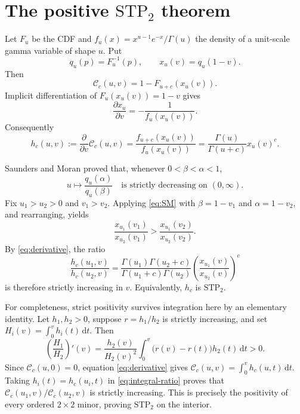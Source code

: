 \documentclass[11pt]{article}
\newcommand{\Cc}{\mathcal C}
\newcommand{\dd}{\,\mathrm d}
\newcommand{\STP}{\mathrm{STP}}
\begin{document}
\section*{The positive \texorpdfstring{\(\STP_2\)}{STP2} theorem}

Let \(F_u\) be the CDF and \(f_u(x)=x^{u-1}e^{-x}/\Gamma(u)\) the density of a
unit-scale gamma variable of shape \(u\).  Put
\[
 q_u(p)=F_u^{-1}(p),\qquad x_u(v)=q_u(1-v).
\]
Then
\[
 \Cc_c(u,v)=1-F_{u+c}(x_u(v)).
\]
Implicit differentiation of \(F_u(x_u(v))=1-v\) gives
\[
 \frac{\partial x_u}{\partial v}=-\frac1{f_u(x_u(v))}.
\]
Consequently
\begin{equation}\label{eq:derivative}
 h_c(u,v):=\frac{\partial}{\partial v}\Cc_c(u,v)
 =\frac{f_{u+c}(x_u(v))}{f_u(x_u(v))}
 =\frac{\Gamma(u)}{\Gamma(u+c)}x_u(v)^c.
\end{equation}

Saunders and Moran proved that, whenever \(0<\beta<\alpha<1\),
\begin{equation}\label{eq:SM}
 u\longmapsto\frac{q_u(\alpha)}{q_u(\beta)}
 \quad\text{is strictly decreasing on }(0,\infty).
\end{equation}
Fix \(u_1>u_2>0\) and \(v_1>v_2\).  Applying \eqref{eq:SM} with
\(\beta=1-v_1\) and \(\alpha=1-v_2\), and rearranging, yields
\begin{equation}\label{eq:ratio-x}
 \frac{x_{u_1}(v_1)}{x_{u_2}(v_1)}
 >\frac{x_{u_1}(v_2)}{x_{u_2}(v_2)}.
\end{equation}
By \eqref{eq:derivative}, the ratio
\[
 \frac{h_c(u_1,v)}{h_c(u_2,v)}
 =\frac{\Gamma(u_1)\Gamma(u_2+c)}
        {\Gamma(u_1+c)\Gamma(u_2)}
  \left(\frac{x_{u_1}(v)}{x_{u_2}(v)}\right)^c
\]
is therefore strictly increasing in \(v\).  Equivalently, \(h_c\) is
\(\STP_2\).

For completeness, strict positivity survives integration here by an elementary
identity.  Let \(h_1,h_2>0\), suppose \(r=h_1/h_2\) is strictly increasing,
and set \(H_i(v)=\int_0^v h_i(t)\dd t\).  Then
\begin{equation}\label{eq:integral-ratio}
 \left(\frac{H_1}{H_2}\right)'(v)
 =\frac{h_2(v)}{H_2(v)^2}
   \int_0^v\bigl(r(v)-r(t)\bigr)h_2(t)\dd t>0.
\end{equation}
Since \(\Cc_c(u,0)=0\), equation \eqref{eq:derivative} gives
\(\Cc_c(u,v)=\int_0^v h_c(u,t)\dd t\).  Taking
\(h_i(t)=h_c(u_i,t)\) in \eqref{eq:integral-ratio} proves that
\(\Cc_c(u_1,v)/\Cc_c(u_2,v)\) is strictly increasing.  This is precisely the
positivity of every ordered \(2\times2\) minor, proving \(\STP_2\) on the
interior.
\end{document}
